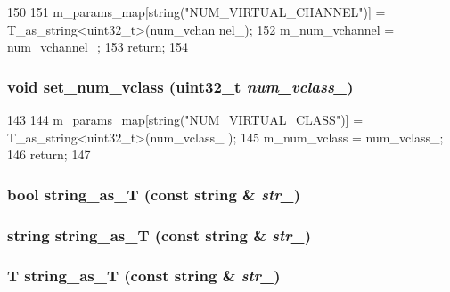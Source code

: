 \begin{DoxyCode}
150 {
151     m_params_map[string("NUM_VIRTUAL_CHANNEL")] = T_as_string<uint32_t>(num_vchan
      nel_);
152     m_num_vchannel = num_vchannel_;
153     return;
154 }
\end{DoxyCode}
\hypertarget{classOrionConfig_a2725040527b398c99c2b1bcb7aeeb19a}{
\subsubsection[{set\_\-num\_\-vclass}]{\setlength{\rightskip}{0pt plus 5cm}void set\_\-num\_\-vclass ({\bf uint32\_\-t} {\em num\_\-vclass\_\-})}}
\label{classOrionConfig_a2725040527b398c99c2b1bcb7aeeb19a}



\begin{DoxyCode}
143 {
144     m_params_map[string("NUM_VIRTUAL_CLASS")] = T_as_string<uint32_t>(num_vclass_
      );
145     m_num_vclass = num_vclass_;
146     return;
147 }
\end{DoxyCode}
\hypertarget{classOrionConfig_a0348546f8827bf517dcb6617d71e2a99}{
\subsubsection[{string\_\-as\_\-T}]{\setlength{\rightskip}{0pt plus 5cm}bool string\_\-as\_\-T (const string \& {\em str\_\-})}}
\label{classOrionConfig_a0348546f8827bf517dcb6617d71e2a99}
\hypertarget{classOrionConfig_a56e435d7b2ac5ca70e2ce287128b0066}{
\subsubsection[{string\_\-as\_\-T}]{\setlength{\rightskip}{0pt plus 5cm}string string\_\-as\_\-T (const string \& {\em str\_\-})}}
\label{classOrionConfig_a56e435d7b2ac5ca70e2ce287128b0066}
\hypertarget{classOrionConfig_aeb46f3372898d79187ee6b8bda1d0653}{
\subsubsection[{string\_\-as\_\-T}]{\setlength{\rightskip}{0pt plus 5cm}T string\_\-as\_\-T (const string \& {\em str\_\-})}}
\label{classOrionConfig_aeb46f3372898d79187ee6b8bda1d0653}



